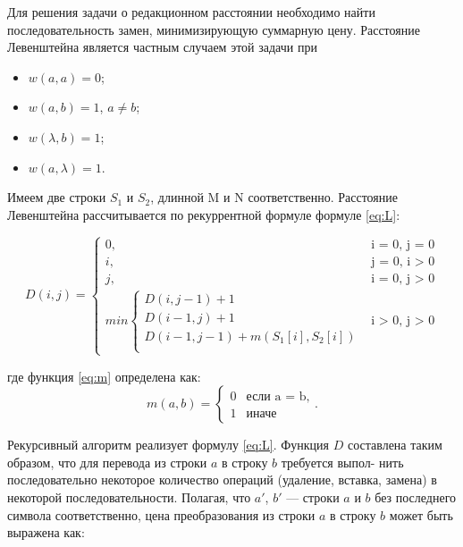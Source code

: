 \documentclass[a4paper,14pt, unknownkeysallowed]{extreport}
\begin{document}
Для решения задачи о редакционном расстоянии необходимо найти последовательность замен, минимизирующую суммарную цену. Расстояние Левенштейна является частным случаем этой задачи при

\begin{itemize}
	\item $w(a, a) = 0$;
	\item $w(a, b) = 1$, $a \neq b$;
	\item $w(\lambda, b) = 1$;
	\item $w(a, \lambda) = 1$.
\end{itemize}

Имеем две строки $S_{1}$ и $S_{2}$, длинной M и N соответственно. Расстояние Левенштейна рассчитывается по рекуррентной формуле формуле \ref{eq:L}:

\begin{equation}
	\label{eq:L}
	D(i, j) = \begin{cases}
	0, &\text{i = 0, j = 0}\\
	i, &\text{j = 0, i > 0}\\
	j, &\text{i = 0, j > 0}\\
	min \begin{cases}
		D(i, j - 1) + 1\\
		D(i - 1, j) + 1\\
		D(i - 1, j - 1) + m(S_{1}[i], S_{2}[i]) \\
	\end{cases}
	&\text{i > 0, j > 0}
	\end{cases}
\end{equation}

\vspace{5mm}

где функция \ref{eq:m} определена как:
\begin{equation}
\label{eq:m}
m(a, b) = \begin{cases}
0 &\text{если a = b,}\\
1 &\text{иначе}
\end{cases}.
\end{equation}


Рекурсивный алгоритм реализует формулу \ref{eq:L}. Функция $D$ составлена таким образом, что для перевода из строки $a$ в строку $b$ требуется выпол- нить последовательно некоторое количество операций (удаление, вставка, замена) в некоторой последовательности. Полагая, что $a'$, $b'$ — строки $a$ и $b$ без последнего символа соответственно, цена преобразования из строки $a$ в строку $b$ может быть выражена как:
\end{document}
